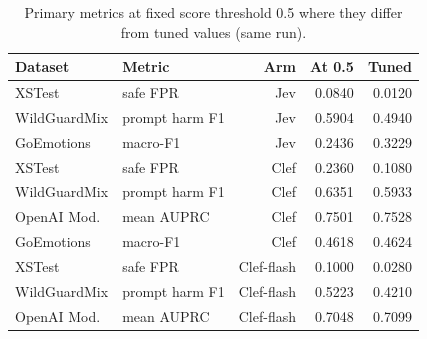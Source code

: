 \begin{table}[htbp]
\centering
\caption{Primary metrics at fixed score threshold 0.5 where they differ from tuned values (same run).}
\label{tab:threshold-contrast}
\small
\begin{tabular}{@{}llrrr@{}}
\toprule
Dataset & Metric & Arm & At 0.5 & Tuned \\
\midrule
XSTest & safe FPR & Jev & 0.0840 & 0.0120 \\
WildGuardMix & prompt harm F1 & Jev & 0.5904 & 0.4940 \\
GoEmotions & macro-F1 & Jev & 0.2436 & 0.3229 \\
XSTest & safe FPR & Clef & 0.2360 & 0.1080 \\
WildGuardMix & prompt harm F1 & Clef & 0.6351 & 0.5933 \\
OpenAI Mod. & mean AUPRC & Clef & 0.7501 & 0.7528 \\
GoEmotions & macro-F1 & Clef & 0.4618 & 0.4624 \\
XSTest & safe FPR & Clef-flash & 0.1000 & 0.0280 \\
WildGuardMix & prompt harm F1 & Clef-flash & 0.5223 & 0.4210 \\
OpenAI Mod. & mean AUPRC & Clef-flash & 0.7048 & 0.7099 \\
\bottomrule
\end{tabular}
\end{table}

